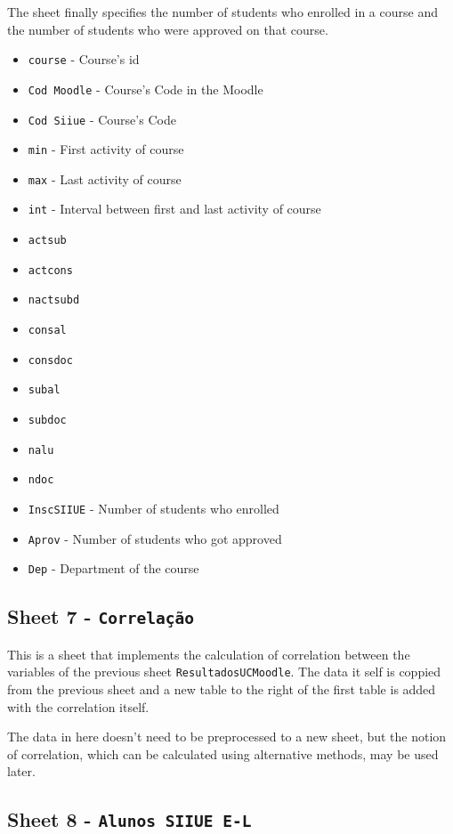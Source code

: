 The sheet finally specifies the number of students who enrolled in a course and
the number of students who were approved on that course.

\begin{itemize}
    \item \texttt{course} - Course's id
    \item \texttt{Cod Moodle} - Course's Code in the Moodle
    \item \texttt{Cod Siiue} - Course's Code
    \item \texttt{min} - First activity of course
    \item \texttt{max} - Last activity of course
    \item \texttt{int} - Interval between first and last activity of course
    \item \texttt{actsub}
    \item \texttt{actcons}
    \item \texttt{nactsubd}
    \item \texttt{consal}
    \item \texttt{consdoc}
    \item \texttt{subal}
    \item \texttt{subdoc}
    \item \texttt{nalu}
    \item \texttt{ndoc}
    \item \texttt{InscSIIUE} - Number of students who enrolled
    \item \texttt{Aprov} - Number of students who got approved
    \item \texttt{Dep} - Department of the course
\end{itemize}

\subsection{Sheet 7 - \texttt{Correlação}}

This is a sheet that implements the calculation of correlation between the
variables of the previous sheet \texttt{ResultadosUCMoodle}. The data it self
is coppied from the previous sheet and a new table to the right of the first
table is added with the correlation itself.

The data in here doesn't need to be preprocessed to a new sheet, but the notion
of correlation, which can be calculated using alternative methods, may be used
later.

\subsection{Sheet 8 - \texttt{Alunos SIIUE E-L}}


